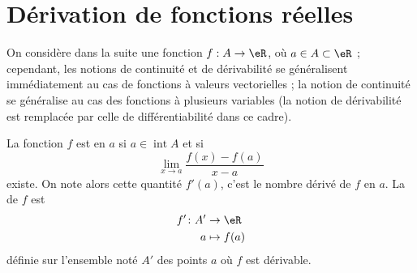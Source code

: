 \section{Dérivation de fonctions réelles}
\label{seccontetderiv}

On considère dans la suite une fonction $f : A \to \eR$, où $a \in A \subset \eR$ ; cependant, les notions de continuité et de dérivabilité se généralisent immédiatement au cas de fonctions à valeurs vectorielles ; la notion de continuité se généralise au cas des fonctions à plusieurs variables (la notion de dérivabilité est remplacée par celle de différentiabilité dans ce cadre).

\begin{definition}      \label{DEFooOYFZooFWmcAB}
    La fonction $f$ est  en \( a\) si $a \in
  \operatorname{int} A$ et si
  \begin{equation*}
    \lim_{x\to a} \frac{f(x)-f(a)}{x-a}
  \end{equation*}
  existe. On note alors cette quantité $f'(a)$, c'est le nombre
  dérivé de $f$ en $a$. La  de $f$ est
  \begin{equation}
      \begin{aligned}
          f'\colon A'&\to \eR \\
          a&\mapsto f(a)
      \end{aligned}
  \end{equation}
  définie sur l'ensemble noté $A'$ des points $a$ où $f$ est dérivable.
\end{definition}

